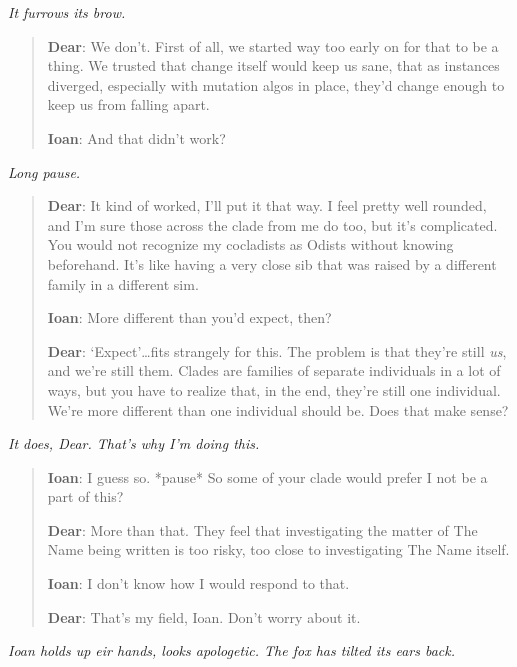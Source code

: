 \emph{It furrows its brow.}

\begin{quote}
\textbf{Dear}: We don't. First of all, we started way too early on for that to be a thing. We trusted that change itself would keep us sane, that as instances diverged, especially with mutation algos in place, they'd change enough to keep us from falling apart.

\textbf{Ioan}: And that didn't work?
\end{quote}

\emph{Long pause.}

\begin{quote}
\textbf{Dear}: It kind of worked, I'll put it that way. I feel pretty well rounded, and I'm sure those across the clade from me do too, but it's complicated. You would not recognize my cocladists as Odists without knowing beforehand. It's like having a very close sib that was raised by a different family in a different sim.

\textbf{Ioan}: More different than you'd expect, then?

\textbf{Dear}: `Expect'\ldots{}fits strangely for this. The problem is that they're still \emph{us}, and we're still them. Clades are families of separate individuals in a lot of ways, but you have to realize that, in the end, they're still one individual. We're more different than one individual should be. Does that make sense?
\end{quote}

\emph{It does, Dear. That's why I'm doing this.}

\begin{quote}
\textbf{Ioan}: I guess so. *pause* So some of your clade would prefer I not be a part of this?

\textbf{Dear}: More than that. They feel that investigating the matter of The Name being written is too risky, too close to investigating The Name itself.

\textbf{Ioan}: I don't know how I would respond to that.

\textbf{Dear}: That's my field, Ioan. Don't worry about it.
\end{quote}

\emph{Ioan holds up eir hands, looks apologetic. The fox has tilted its ears back.}

